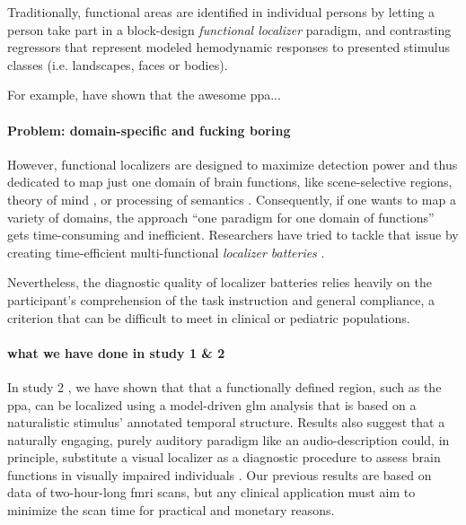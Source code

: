 Traditionally, functional areas are identified in individual persons by letting
a person take part in a block-design \textit{functional localizer} paradigm, and
contrasting regressors that represent modeled hemodynamic responses to presented
stimulus classes (i.e. landscapes, faces or bodies).


For example, \citep{rosenke2021probabilistic, weiner2018defining,
zhen2017quantifying} have shown that the awesome \ac{ppa}...


\paragraph{Problem: domain-specific and fucking boring}


However, functional localizers are designed to maximize detection power and thus
dedicated to map just one domain of brain functions, like scene-selective
regions, theory of mind \citep{spunt2014validating}, or processing of semantics
\citep{fernandez2001language}.
Consequently, if one wants to map a variety of domains, the approach ``one
paradigm for one domain of functions'' gets time-consuming and inefficient.
Researchers have tried to tackle that issue by creating time-efficient
multi-functional \textit{localizer batteries} \citep[e.g.,][]{barch2013function,
drobyshevsky2006rapid, pinel2007fast}.

Nevertheless, the diagnostic quality of localizer batteries relies heavily on
the participant's comprehension of the task instruction and general compliance,
a criterion that can be difficult to meet in clinical or pediatric populations.


\paragraph{what we have done in study 1 \& 2}

%
In study 2 \citep{haeusler2022processing}, we have shown that that a
functionally defined region, such as the \ac{ppa}, can be localized using a
model-driven \ac{glm} analysis that is based on a naturalistic stimulus'
annotated temporal structure.
%
Results also suggest that a naturally engaging, purely auditory paradigm like an
audio-description could, in principle, substitute a visual localizer as a
diagnostic procedure to assess brain functions in visually impaired individuals
\citep{haeusler2022processing}.
%
Our previous results are based on data of two-hour-long \ac{fmri} scans, but
any clinical application must aim to minimize the scan time for practical and
monetary reasons.


